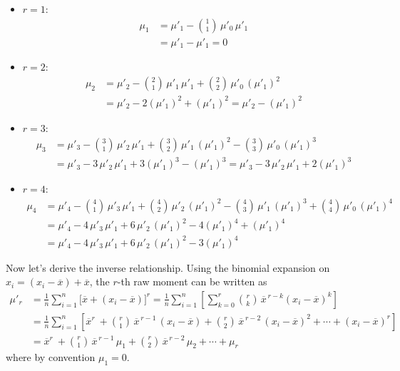 \documentclass[twoside]{book}
\begin{document}
\begin{itemize}
  \item \(r=1:\)
    \begin{align*}
      \mu_1
      &= \mu'_1 - \binom{1}{1}\,\mu'_0\,\mu'_1 \\
      &= \mu'_1 - \mu'_1 = 0
    \end{align*}


  \item \(r=2:\)
    \begin{align*}
      \mu_2
      &= \mu'_2
         - \binom{2}{1}\,\mu'_1\,\mu'_1
         + \binom{2}{2}\,\mu'_0\,(\mu'_1)^2 \\
      &= \mu'_2 - 2(\mu'_1)^2 + (\mu'_1)^2
      = \mu'_2 - (\mu'_1)^2
    \end{align*}


  \item \(r=3:\)
    \begin{align*}
      \mu_3
      &= \mu'_3
         - \binom{3}{1}\,\mu'_2\,\mu'_1
         + \binom{3}{2}\,\mu'_1\,(\mu'_1)^2
         - \binom{3}{3}\,\mu'_0\,(\mu'_1)^3 \\
      &= \mu'_3 - 3\,\mu'_2\,\mu'_1 + 3(\mu'_1)^3 - (\mu'_1)^3
      = \mu'_3 - 3\,\mu'_2\,\mu'_1 + 2(\mu'_1)^3
    \end{align*}


  \item \(r=4:\)
    \begin{align*}
      \mu_4
      &= \mu'_4
         - \binom{4}{1}\,\mu'_3\,\mu'_1
         + \binom{4}{2}\,\mu'_2\,(\mu'_1)^2
         - \binom{4}{3}\,\mu'_1\,(\mu'_1)^3
         + \binom{4}{4}\,\mu'_0\,(\mu'_1)^4 \\
      &= \mu'_4 - 4\,\mu'_3\,\mu'_1 + 6\,\mu'_2\,(\mu'_1)^2 - 4(\mu'_1)^4 + (\mu'_1)^4 \\
      &= \mu'_4 - 4\,\mu'_3\,\mu'_1 + 6\,\mu'_2\,(\mu'_1)^2 - 3(\mu'_1)^4
    \end{align*}

\end{itemize}

Now let's derive the inverse relationship. Using the binomial expansion on \(x_i = (x_i - \overline{x}) + \overline{x}\), the \(r\)-th raw moment can be written as
\begin{align*}
\mu'_r
&= \frac{1}{n}\sum_{i=1}^n \bigl[\overline{x}+ (x_i - \overline{x})\bigr]^r
= \frac{1}{n}\sum_{i=1}^n\left[\sum_{k=0}^r \binom{r}{k}\,\overline{x}^{\,r-k} (x_i - \overline{x})^k\right]\\
&= \frac{1}{n}\sum_{i=1}^n\left[\overline{x}^r\
+ \binom{r}{1}\,\overline{x}^{\,r-1}\,(x_i - \overline{x})
+ \binom{r}{2}\,\overline{x}^{\,r-2}\,(x_i - \overline{x})^2
+ \cdots
+ (x_i - \overline{x})^r\right]\\
&= \overline{x}^r\
+ \binom{r}{1}\,\overline{x}^{\,r-1}\,\mu_1
+ \binom{r}{2}\,\overline{x}^{\,r-2}\,\mu_2
+ \cdots
+ \mu_r
\end{align*}
where by convention \(\mu_1 = 0\).
\end{document}
